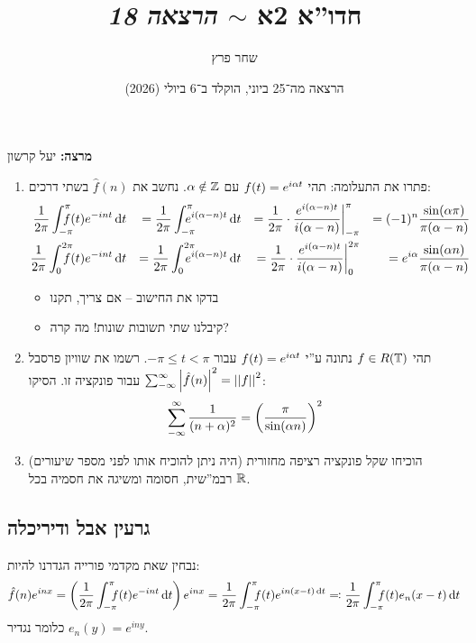 \documentclass[]{../../../../tex/classes/styledArticle}
\author{שחר פרץ}
\title{חדו''א 2א $\sim$ \textit{הרצאה 18}}
\date{הרצאה מה־25 ביוני, הוקלד ב־6 ביולי (2026)}
\begin{document}
	\maketitle
	\textbf{מרצה: }יעל קרשון
	
	\begin{Exercise}[פתיחה]
		\begin{enumerate}
			\item פתרו את התעלומה: תהי $f(t) = e^{i\alpha t}$ עם $\alpha \notin \mathbb{Z}$. נחשב את $\hat f(n)$ בשתי דרכים: 
			\begin{alignat*}{9}
				\frac{1}{2\pi}\int^{\pi}_{-\pi}\dequad f(t) e^{-int}\dt &&= \frac{1}{2\pi}\int^{\pi}_{-\pi}\dequad e^{i(\ag - n)t}\dt &&= \frac{1}{2\pi} \cdot \frac{e^{i(\ag - n)t}}{i(\ag - n)}\bigg\vert^{\pi}_{-\pi}   &&= (-1)^{n}\frac{\sin(\ag \pi)}{\pi(\ag - n)} \\
				\frac{1}{2\pi}\int^{2\pi}_0 \dequad f(t)e^{-int}\dt     &&= \frac{1}{2\pi}\int^{2\pi}_0\dequad e^{i(\ag - n)t}\dt     &&= \frac{1}{2\pi} \cdot \frac{e^{i(\ag -n)t}}{i(\ag - n)}\bigg\vert^{2\pi}_0        &&= e^{i\ag}\frac{\sin(\ag n)}{\pi(\ag - n)}
			\end{alignat*}
			\begin{itemize}
				\item בדקו את החישוב – אם צריך, תקנו
				\item קיבלנו שתי תשובות שונות! מה קרה? 
			\end{itemize}
			\item תהי $f \in R(\mathbb{T})$ נתונה ע''י $f(t) = e^{i \alpha t}$ עבור $-\pi \le t < \pi$. רשמו את שוויון פרסבל $\sum_{-\infty}^{\infty}\left \lvert \hat f(n) \right \rvert^{2} = \left \vert \left \vert f \right \vert \right \vert^{2}$ עבור פונקציה זו. הסיקו: 
			\[ \sum_{-\infty}^{\infty}\frac{1}{(n + \alpha)^{2}} = \left ( \frac{\pi}{\sin(\alpha n)} \right )^{2} \]
			\item (היה ניתן להוכיח אותו לפני מספר שיעורים) הוכיחו שקל פונקציה רציפה מחזורית רבמ''שית, חסומה ומשיגה את חסמיה בכל $\mathbb{R}$. 
		\end{enumerate}
	\end{Exercise}
	
	\subsection*{גרעין אבל ודיריכלה}
	נבחין שאת מקדמי פורייה הגדרנו להיות: 
	\[ \hat f(n) e^{inx} = \cl{\frac{1}{2\pi}\int^{\pi}_{-\pi}\dequad \ f(t)e^{-int}\dt}e^{inx} = \frac{1}{2\pi}\int^{\pi}_{-\pi}\dequad \ f(t)e^{in(x - t)\dt} \doc \frac{1}{2\pi}\int^{\pi}_{-\pi}\dequad \ f(t)e_n(x - t)\dt \]
	כלומר נגדיר $e_n(y) = e^{iny}$. 
	
\end{document}
